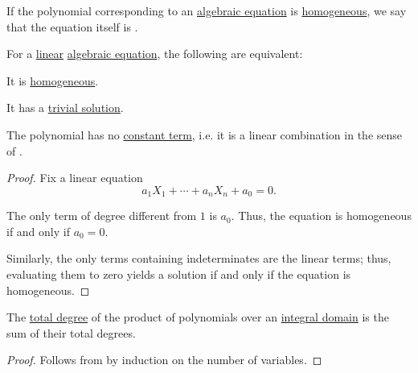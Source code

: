 \begin{definition}\label{def:homogeneous_equation}\mimprovised
  If the polynomial corresponding to an \hyperref[def:algebraic_equation]{algebraic equation} is \hyperref[def:homogeneous_polynomial]{homogeneous}, we say that the equation itself is .
\end{definition}

\begin{proposition}\label{thm:homogeneous_linear_equation}
  For a \hyperref[def:polynomial_degree_terminology]{linear} \hyperref[def:algebraic_equation]{algebraic equation}, the following are equivalent:
  \begin{thmenum}
     It is \hyperref[def:homogeneous_equation]{homogeneous}.

     It has a \hyperref[def:algebraic_equation/trivial_solution]{trivial solution}.

     The polynomial has no \hyperref[def:univariate_polynomial]{constant term}, i.e. it is a linear combination in the sense of .
  \end{thmenum}
\end{proposition}
\begin{proof}
  Fix a linear equation
  \begin{equation*}
    a_1 X_1 + \cdots + a_n X_n + a_0 = 0.
  \end{equation*}

  The only term of degree different from \( 1 \) is \( a_0 \). Thus, the equation is homogeneous if and only if \( a_0 = 0 \).

  Similarly, the only terms containing indeterminates are the linear terms; thus, evaluating them to zero yields a solution if and only if the equation is homogeneous.
\end{proof}

\begin{proposition}\label{thm:degree_of_multivariate_polynomial_product}
  The \hyperref[def:polynomial_degree]{total degree} of the product of polynomials over an \hyperref[def:integral_domain]{integral domain} is the sum of their total degrees.
\end{proposition}
\begin{proof}
  Follows from  by induction on the number of variables.
\end{proof}

